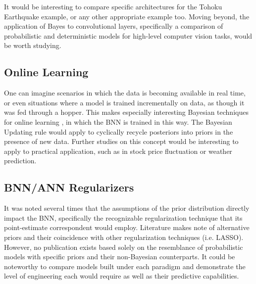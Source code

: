 It would be interesting to compare specific architectures for the Tohoku Earthquake example, or any other appropriate example too.  Moving beyond, the application of Bayes to convolutional layers, specifically a comparison of probabilistic and deterministic models for high-level computer vision tasks, would be worth studying.


\subsection{Online Learning}
One can imagine scenarios in which the data is becoming available in real time, or even situations where a model is trained incrementally on data, as though it was fed through a hopper.  This makes especially interesting Bayesian techniques for online learning \cite{opper1999bayesian}, in which the BNN is trained in this way.  The Bayesian Updating rule would apply to cyclically recycle posteriors into priors in the presence of new data.  Further studies on this concept would be interesting to apply to practical application, such as in stock price fluctuation or weather prediction.

\subsection{BNN/ANN Regularizers}
It was noted several times that the assumptions of the prior distribution directly impact the BNN, specifically the recognizable regularization technique that its point-estimate correspondent would employ.  Literature \cite{vladimirova2019understanding} \cite{chiuso2016regularization} makes note of alternative priors and their coincidence with other regularization techniques (i.e. LASSO).  However, no publication exists based solely on the resemblance of probabilistic models with specific priors and their non-Bayesian counterparts.  It could be noteworthy to compare models built under each paradigm and demonstrate the level of engineering each would require as well as their predictive capabilities.

